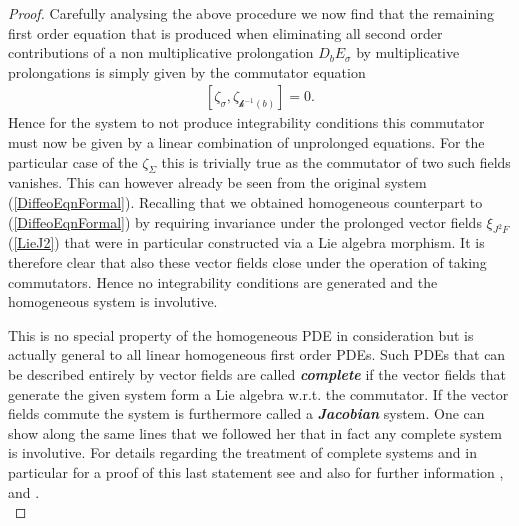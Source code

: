 \documentclass[a4paper,12pt, DIV=14, BCOR=5mm, twoside, headsepline, numbers=noenddot]{scrbook}
\begin{document}
\begin{proof}
Carefully analysing the above procedure we now find that the remaining first order equation that is produced when eliminating all second order contributions of a non multiplicative prolongation $D_bE_{\sigma}$ by multiplicative prolongations is simply given by the commutator equation
\begin{align}
    \left [\zeta_{\sigma}, \zeta_{\mathcal{k}^{-1}(b)} \right] = 0.
\end{align}
Hence for the system to not produce integrability conditions this commutator must now be given by a linear combination of unprolonged equations. For the particular case of the $\zeta_{\Sigma}$ this is trivially true as the commutator of two such fields vanishes. This can however already be seen from the original system (\ref{DiffeoEqnFormal}).
Recalling that we obtained homogeneous counterpart to (\ref{DiffeoEqnFormal}) by requiring invariance under the prolonged vector fields $\xi_{J^2F}$ (\ref{LieJ2}) that were in particular constructed via a Lie algebra morphism. It is therefore clear that also these vector fields close under the operation of taking commutators. Hence no integrability conditions are generated and the homogeneous system is involutive.

This is no special property of the homogeneous PDE in consideration but is actually general to all linear homogeneous first order PDEs. Such PDEs that can be described entirely by vector fields are called \textit{\textbf{complete}} if the vector fields that generate the given system form a Lie algebra w.r.t. the commutator. If the vector fields commute the system is furthermore called a \textit{\textbf{Jacobian}} system. One can show along the same lines that we followed her that in fact any complete system is involutive. For details regarding the treatment of complete systems and in particular for a proof of this last statement see \cite{seiler1994analysis} and also for further information \cite{Clebsch1866}, \cite{caratheodory1956variationsrechnung} and \cite{lie1970theorie}.\\


\end{proof}
\end{document}
